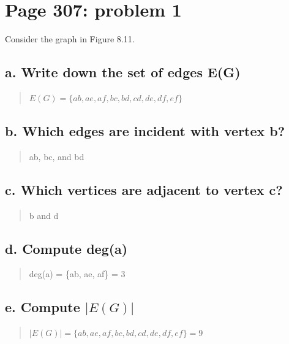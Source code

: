 \documentclass[]{article}
\begin{document}
\newpage

\section{Page 307: problem 1}\label{page-307-problem-1}

Consider the graph in Figure 8.11.

\subsection{a. Write down the set of edges
E(G)}\label{a.-write-down-the-set-of-edges-eg}

\begin{quote}
\(E(G) = \{ab, ae, af, bc, bd, cd, de, df, ef\}\)
\end{quote}

\subsection{b. Which edges are incident with vertex
b?}\label{b.-which-edges-are-incident-with-vertex-b}

\begin{quote}
ab, bc, and bd
\end{quote}

\subsection{c. Which vertices are adjacent to vertex
c?}\label{c.-which-vertices-are-adjacent-to-vertex-c}

\begin{quote}
b and d
\end{quote}

\subsection{d. Compute deg(a)}\label{d.-compute-dega}

\begin{quote}
deg(a) = \{ab, ae, af\} = 3
\end{quote}

\subsection{\texorpdfstring{e. Compute
\(|E(G)|\)}{e. Compute \textbar{}E(G)\textbar{}}}\label{e.-compute-eg}

\begin{quote}
\(|E(G)|= \{ab, ae, af, bc, bd, cd, de, df, ef\} = 9\)
\end{quote}
\end{document}
